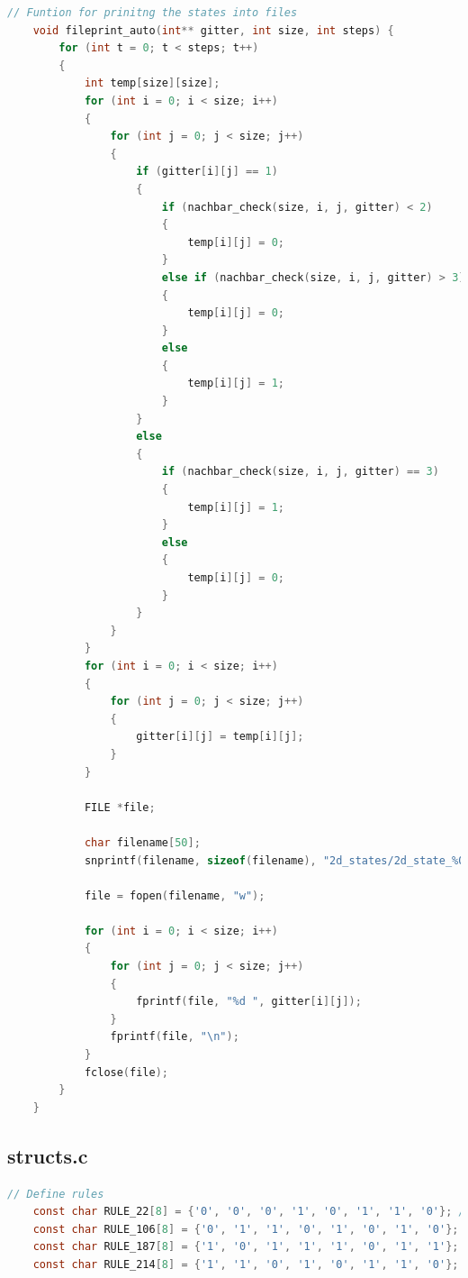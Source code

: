 \documentclass[12pt,a4paper]{article}
\begin{document}
\begin{lstlisting}[caption={\small stepcom.c},label={lst:p7001},basicstyle=\ttfamily\tiny,language=C]
    // Funtion for prinitng the states into files
    void fileprint_auto(int** gitter, int size, int steps) {
        for (int t = 0; t < steps; t++)
        {
            int temp[size][size];
            for (int i = 0; i < size; i++)
            {
                for (int j = 0; j < size; j++)
                {
                    if (gitter[i][j] == 1)
                    {
                        if (nachbar_check(size, i, j, gitter) < 2)
                        {
                            temp[i][j] = 0;
                        }
                        else if (nachbar_check(size, i, j, gitter) > 3)
                        {
                            temp[i][j] = 0;
                        }
                        else
                        {
                            temp[i][j] = 1;
                        }
                    }
                    else
                    {
                        if (nachbar_check(size, i, j, gitter) == 3)
                        {
                            temp[i][j] = 1;
                        }
                        else
                        {
                            temp[i][j] = 0;
                        }
                    }
                }
            }
            for (int i = 0; i < size; i++)
            {
                for (int j = 0; j < size; j++)
                {
                    gitter[i][j] = temp[i][j];
                }
            }

            FILE *file;

            char filename[50];
            snprintf(filename, sizeof(filename), "2d_states/2d_state_%04d.txt", t + 1);

            file = fopen(filename, "w");

            for (int i = 0; i < size; i++)
            {
                for (int j = 0; j < size; j++)
                {
                    fprintf(file, "%d ", gitter[i][j]);
                }
                fprintf(file, "\n");
            }
            fclose(file);
        }
    }
\end{lstlisting}


\vspace{1cm}

\subsection*{\small structs.c}
\begin{lstlisting}[caption={\small structs.c},label={lst:p7001},basicstyle=\ttfamily\tiny,language=C]
    // Define rules
    const char RULE_22[8] = {'0', '0', '0', '1', '0', '1', '1', '0'}; // 22 in binary
    const char RULE_106[8] = {'0', '1', '1', '0', '1', '0', '1', '0'}; // 106 in binary
    const char RULE_187[8] = {'1', '0', '1', '1', '1', '0', '1', '1'}; // 187 in binary
    const char RULE_214[8] = {'1', '1', '0', '1', '0', '1', '1', '0'}; // 214 in binary
\end{lstlisting}
\end{document}
